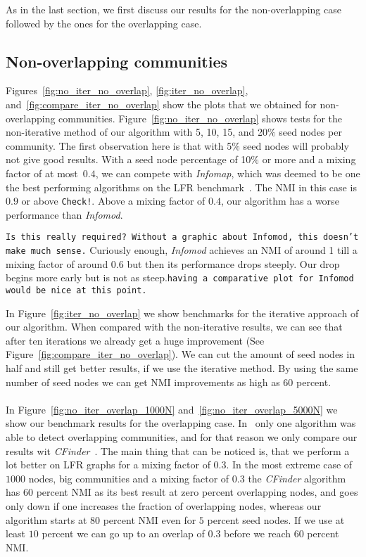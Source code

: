 As in the last section, we first discuss our results for the non-overlapping case followed by 
the ones for the overlapping case.

\subsection{Non-overlapping communities}
Figures~\ref{fig:no_iter_no_overlap}, \ref{fig:iter_no_overlap}, and~\ref{fig:compare_iter_no_overlap}
show the plots that we obtained for non-overlapping communities. Figure~\ref{fig:no_iter_no_overlap}
shows tests for the non-iterative method of our algorithm with 5, 10, 15, and 20$\%$ seed nodes per 
community. The first observation here is that with 5$\%$ seed nodes will probably not give good results.  
With a seed node percentage of 10$\%$ or more and a mixing factor of at most~$0.4$, we can compete 
with \textit{Infomap}, which was deemed to be one the best performing algorithms on the 
LFR benchmark~\cite{LF09}. The NMI in this case is $0.9$ or above \texttt{Check!}. 
Above a mixing factor of $0.4$, our algorithm has a worse performance than \textit{Infomod}. 

\texttt{Is this really required? Without a graphic about Infomod, this doesn't make much sense.}
Curiously enough, \textit{Infomod} achieves an NMI of around 1 till a mixing factor of around 
$0.6$ but then its performance drops steeply. Our drop begins more early but is not 
as steep.\texttt{having a comparative plot for Infomod would be nice at this point.}

In Figure~\ref{fig:iter_no_overlap} we show benchmarks for the iterative approach of 
our algorithm. When compared with the non-iterative results, we can see that after 
ten iterations we already get a huge improvement (See Figure~\ref{fig:compare_iter_no_overlap}). 
We can cut the amount of seed nodes in half and still get better results, if we use 
the iterative method. By using the same number of seed nodes we can get NMI 
improvements as high as $60$ percent.\\ \\ In Figure~\ref{fig:no_iter_overlap_1000N} 
and~\ref{fig:no_iter_overlap_5000N} we show our benchmark results for the overlapping 
case. In~\cite{LF09} only one algorithm was able to detect overlapping communities, 
and for that reason we only compare our results wit \textit{CFinder}~\cite{PDFV05}. 
The main thing that can be noticed is, that we perform a lot better on LFR graphs for 
a mixing factor of $0.3$. In the most extreme case of $1000$ nodes, big communities 
and a mixing factor of $0.3$ the \textit{CFinder} algorithm has $60$ percent NMI as 
its best result at zero percent overlapping nodes, and goes only down if one increases 
the fraction of overlapping nodes, whereas our algorithm starts at $80$ percent NMI 
even for $5$ percent seed nodes. If we use at least $10$ percent we can go up to 
an overlap of $0.3$ before we reach $60$ percent NMI.


